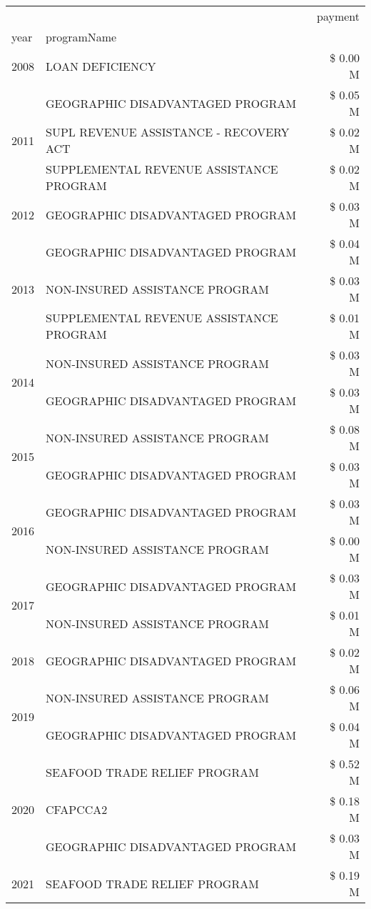 \begin{tabular}{llr}
\toprule
 &  & payment \\
year & programName &  \\
\midrule
2008 & LOAN DEFICIENCY & \$ 0.00 M \\
\cline{1-3}
\multirow[t]{3}{*}{2011} & GEOGRAPHIC DISADVANTAGED PROGRAM & \$ 0.05 M \\
 & SUPL REVENUE ASSISTANCE - RECOVERY ACT & \$ 0.02 M \\
 & SUPPLEMENTAL REVENUE ASSISTANCE PROGRAM & \$ 0.02 M \\
\cline{1-3}
2012 & GEOGRAPHIC DISADVANTAGED PROGRAM & \$ 0.03 M \\
\cline{1-3}
\multirow[t]{3}{*}{2013} & GEOGRAPHIC DISADVANTAGED PROGRAM & \$ 0.04 M \\
 & NON-INSURED ASSISTANCE PROGRAM & \$ 0.03 M \\
 & SUPPLEMENTAL REVENUE ASSISTANCE PROGRAM & \$ 0.01 M \\
\cline{1-3}
\multirow[t]{2}{*}{2014} & NON-INSURED ASSISTANCE PROGRAM & \$ 0.03 M \\
 & GEOGRAPHIC DISADVANTAGED PROGRAM & \$ 0.03 M \\
\cline{1-3}
\multirow[t]{2}{*}{2015} & NON-INSURED ASSISTANCE PROGRAM & \$ 0.08 M \\
 & GEOGRAPHIC DISADVANTAGED PROGRAM & \$ 0.03 M \\
\cline{1-3}
\multirow[t]{2}{*}{2016} & GEOGRAPHIC DISADVANTAGED PROGRAM              & \$ 0.03 M \\
 & NON-INSURED ASSISTANCE PROGRAM                & \$ 0.00 M \\
\cline{1-3}
\multirow[t]{2}{*}{2017} & GEOGRAPHIC DISADVANTAGED PROGRAM & \$ 0.03 M \\
 & NON-INSURED ASSISTANCE PROGRAM & \$ 0.01 M \\
\cline{1-3}
2018 & GEOGRAPHIC DISADVANTAGED PROGRAM & \$ 0.02 M \\
\cline{1-3}
\multirow[t]{2}{*}{2019} & NON-INSURED ASSISTANCE PROGRAM & \$ 0.06 M \\
 & GEOGRAPHIC DISADVANTAGED PROGRAM & \$ 0.04 M \\
\cline{1-3}
\multirow[t]{3}{*}{2020} & SEAFOOD TRADE RELIEF PROGRAM & \$ 0.52 M \\
 & CFAPCCA2 & \$ 0.18 M \\
 & GEOGRAPHIC DISADVANTAGED PROGRAM & \$ 0.03 M \\
\cline{1-3}
2021 & SEAFOOD TRADE RELIEF PROGRAM & \$ 0.19 M \\
\cline{1-3}
\bottomrule
\end{tabular}
